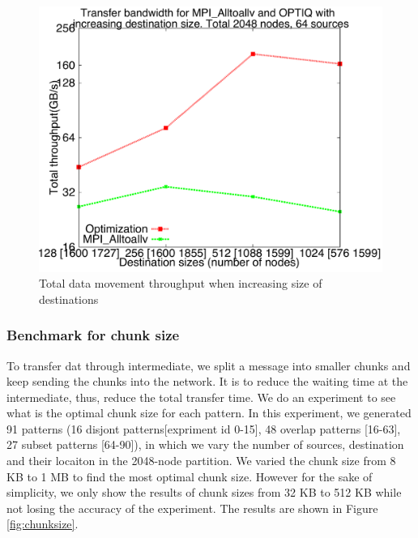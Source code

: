 \begin{figure}[!htb]
\vspace{-0.1in}
\centering
\includegraphics[scale=0.30]{figures/incrsize.pdf}
\vspace{-0.1in}
\caption{Total data movement throughput when increasing size of destinations}
\vspace{-0.1in}
\label{fig:incrsize}
\end{figure}

\subsubsection{Benchmark for chunk size}

To transfer dat through intermediate, we split a message into smaller chunks and keep sending the chunks into the network. It is to reduce the waiting time at the intermediate, thus, reduce the total transfer time. We do an experiment to see what is the optimal chunk size for each pattern. In this experiment, we generated 91 patterns (16 disjont patterns[expriment id 0-15], 48 overlap patterns [16-63], 27 subset patterns [64-90]), in which we vary the number of sources, destination and their locaiton in the 2048-node partition. We varied the chunk size from 8 KB to 1 MB to find the most optimal chunk size. However for the sake of simplicity, we only show the results of chunk sizes from 32 KB to 512 KB while not losing the accuracy of the experiment. The results are shown in Figure \ref{fig:chunksize}.

